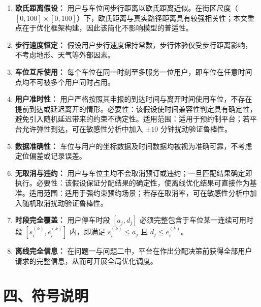 \documentclass{ctexart}
\begin{document}
\begin{enumerate}
  \item \textbf{欧氏距离假设：} 用户与车位间步行距离以欧氏距离近似。在街区尺度（$[0,100]\times[0,100]$）下，欧氏距离与真实路径距离具有较强相关性；本文重点在于优化框架构建，因此该简化不影响模型的普适性。
  \item \textbf{步行速度恒定：} 假设用户步行速度保持常数，步行体验仅受步行距离影响，不考虑地形、天气等外部因素。
  \item \textbf{车位互斥使用：} 每个车位在同一时刻至多服务一位用户，即车位在任意时间点均不可被多个用户同时占用。
  \item \textbf{用户准时性：} 用户严格按照其申报的到达时间与离开时间使用车位，不存在提前到达或延迟离开的情形。必要性：该假设使时间兼容性判定具有确定性，避免引入随机延迟带来的约束不确定性。适用范围：适用于预约制平台；若平台允许弹性到达，可在敏感性分析中加入 $\pm10$ 分钟扰动验证鲁棒性。
  \item \textbf{数据准确性：} 车位与用户的坐标数据及时间数据均被视为准确可靠，不考虑定位偏差或记录误差。
  \item \textbf{无取消与违约：} 用户与车位主均不会取消预订或违约；一旦匹配结果确定即执行。必要性：该假设保证分配结果的确定性，使离线优化结果可直接作为基准。适用范围：适用于强约束预约场景；若存在取消率，可在敏感性分析中加入随机取消扰动验证鲁棒性。
  \item \textbf{时段完全覆盖：} 用户停车时段 $[a_j, d_j]$ 必须完整包含于车位某一连续可用时段 $[s_i^{(k)}, e_i^{(k)}]$ 内，即满足 $s_i^{(k)} \leq a_j$ 且 $d_j \leq e_i^{(k)}$。
  \item \textbf{离线完全信息：} 在问题一与问题二中，平台在作出分配决策前获得全部用户请求的完整信息，从而可开展全局优化调度。
\end{enumerate}

\section*{四、符号说明}
\end{document}
